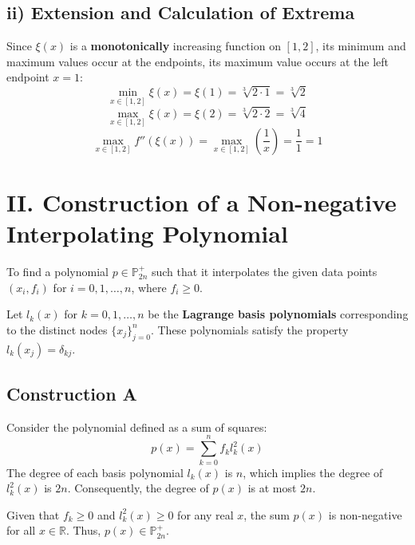 \documentclass[a4paper]{article}
\begin{document}
\subsection*{ii) Extension and Calculation of Extrema}
Since $\xi(x)$ is a \textbf{monotonically} increasing function on $[1, 2]$, its minimum and maximum values occur at the endpoints,  its maximum value occurs at the left endpoint $x=1$:
\[
\min_{x \in [1, 2]} \xi(x) = \xi(1) = \sqrt[3]{2 \cdot 1} = \sqrt[3]{2}
\]
\[
\max_{x \in [1, 2]} \xi(x) = \xi(2) = \sqrt[3]{2 \cdot 2} = \sqrt[3]{4}
\]
\[
\max_{x \in [1, 2]} f''(\xi(x)) = \max_{x \in [1, 2]} \left(\frac{1}{x}\right) = \frac{1}{1} = 1
\]




\section*{II. Construction of a Non-negative Interpolating Polynomial}

To find a polynomial $p \in \mathbb{P}_{2n}^+$ such that it interpolates the given data points $(x_i, f_i)$ for $i=0, 1, \dots, n$, where $f_i \ge 0$.

Let $l_k(x)$ for $k=0, 1, \dots, n$ be the \textbf{Lagrange basis polynomials} corresponding to the distinct nodes $\{x_j\}_{j=0}^n$. These polynomials satisfy the property $l_k(x_j) = \delta_{kj}$.

\subsection*{Construction A}

Consider the polynomial defined as a sum of squares:
\[
p(x) = \sum_{k=0}^{n} f_k l_k^2(x)
\]
The degree of each basis polynomial $l_k(x)$ is $n$, which implies the degree of $l_k^2(x)$ is $2n$. Consequently, the degree of $p(x)$ is at most $2n$.

Given that $f_k \ge 0$ and $l_k^2(x) \ge 0$ for any real $x$, the sum $p(x)$ is non-negative for all $x \in \mathbb{R}$. Thus, $p(x) \in \mathbb{P}_{2n}^+$.
\end{document}
